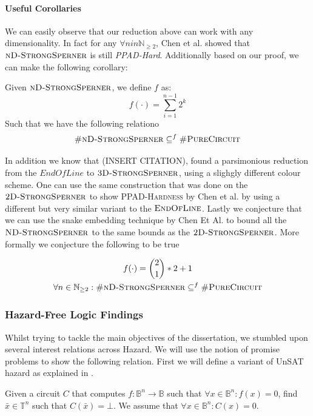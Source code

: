 \paragraph*{Useful Corollaries}
We can easily observe that our reduction above can work with any dimensionality.
In fact for any $\forall n in \mathbb{N}_{\geq 2}$, Chen et al. showed that
$\textsc{nD-StrongSperner}$ is still \textit{PPAD-Hard}. Additionally based on our proof, 
we can make the following corollary:

\begin{corollary}
Given $\textnormal{\textsc{nD-StrongSperner}}$, we define $f$ as:
$$
f(\cdot) = \sum_{i = 1}^{n - 1}2^k
$$
Such that we have the following relationo
$$
\textnormal{\textsc{\#nD-StrongSperner}} \subseteq^f \textnormal{\textsc{\#PureCircuit}}
$$
\end{corollary}

In addition we know that (INSERT CITATION), found a parsimonious
reduction from the $\textit{EndOfLine}$  to $\textnormal{\textsc{3D-StrongSperner}}$,
using a slighgly different colour scheme. One can use the same construction
that was done on the $\textnormal{\textsc{2D-StrongSperner}}$ to show \textsc{PPAD-Hardness}
by Chen et al. by using a different but very similar variant to the $\textsc{EndOfLine}$.
Lastly we conjecture that we can use the snake embedding technique by Chen Et Al. to bound
all the $\textnormal{\textsc{ND-StrongSperner}}$ to the same bounds as the $\textnormal{\textsc{2D-StrongSperner}}$.
More formally we conjecture the following to be true

\begin{conjecture}
\begin{gather*}
    f(\cdot) = \binom{2}{1} * 2 + 1 \\
    \forall n \in \mathbb{N}_{\geq 2} : \textnormal{\textsc{\#nD-StrongSperner}} \subseteq^f \textnormal{\textsc{\#PureCircuit}}  
\end{gather*}
\end{conjecture}

\subsubsection{Hazard-Free Logic Findings}

Whilst trying to tackle the main objectives of the dissertation, we stumbled upon
several interest relations across Hazard. We will use the notion of
promise problems to show the following relation. First we will
define a variant of UnSAT hazard as explained in \cite{ikenmeyer_complexity_2019}.

\begin{definition}
    Given a circuit $C$ that computes $f : \mathbb{B}^n \to \mathbb{B}$ such that
    $\forall x \in \mathbb{B}^n : f(x) = 0$, find $\bar{x} \in \mathbb{T}^n$ such that
    $C(\bar{x}) = \bot$. We assume that $\forall x \in \mathbb{B}^n: C(x) = 0$.
\end{definition}

